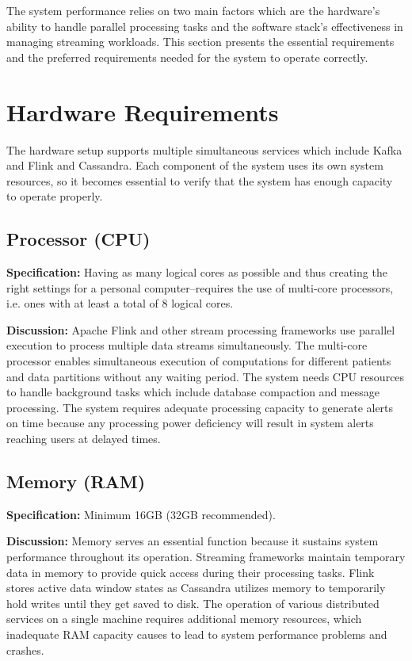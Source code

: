 \documentclass[12pt, a4paper, oneside]{report}
\begin{document}
The system performance relies on two main factors which are the hardware's ability to handle parallel processing tasks and the software stack's effectiveness in managing streaming workloads. This section presents the essential requirements and the preferred requirements needed for the system to operate correctly.

\section{Hardware Requirements}

The hardware setup supports multiple simultaneous services which include Kafka and Flink and Cassandra. Each component of the system uses its own system resources, so it becomes essential to verify that the system has enough capacity to operate properly.

\subsection{Processor (CPU)}

\textbf{Specification:} Having as many logical cores as possible and thus creating the right settings for a personal computer--requires the use of multi-core processors, i.e. ones with at least a total of 8 logical cores.


\textbf{Discussion:}  
Apache Flink and other stream processing frameworks use parallel execution to process multiple data streams simultaneously. The multi-core processor enables simultaneous execution of computations for different patients and data partitions without any waiting period. The system needs CPU resources to handle background tasks which include database compaction and message processing. The system requires adequate processing capacity to generate alerts on time because any processing power deficiency will result in system alerts reaching users at delayed times.

\subsection{Memory (RAM)}

\textbf{Specification:} Minimum 16GB (32GB recommended).

\textbf{Discussion:}  
Memory serves an essential function because it sustains system performance throughout its operation. Streaming frameworks maintain temporary data in memory to provide quick access during their processing tasks. Flink stores active data window states as Cassandra utilizes memory to temporarily hold writes until they get saved to disk. The operation of various distributed services on a single machine requires additional memory resources, which inadequate RAM capacity causes to lead to system performance problems and crashes.
\end{document}
